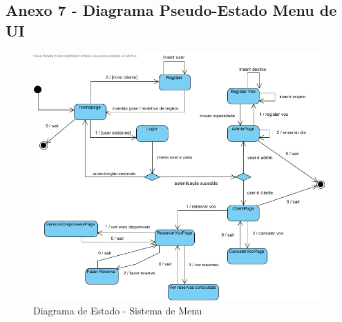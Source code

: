 \documentclass[a4paper,11pt]{article}
\begin{document}
\begin{landscape}
    \subsection{Anexo 7 - Diagrama Pseudo-Estado Menu de UI}
    \begin{figure}[!ht]
        \centering
        \includegraphics[scale=0.7]{diagramas/MenuUI.jpg}
        \caption{Diagrama de Estado - Sistema de Menu} \label{img:menu_estados}
    \end{figure}
\end{landscape}

\end{document}
